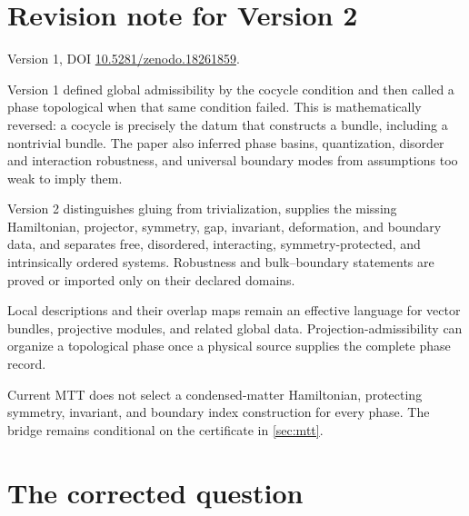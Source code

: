 \documentclass[11pt]{article}
\theoremstyle{definition}
\theoremstyle{remark}
\begin{document}
\section*{Revision note for Version 2}
\begin{description}[leftmargin=3.3cm,style=nextline]
\item[Supersedes.] Version 1, DOI
\href{https://doi.org/10.5281/zenodo.18261859}{10.5281/zenodo.18261859}.

\item[Reason.] Version 1 defined global admissibility by the cocycle
condition and then called a phase topological when that same condition
failed.  This is mathematically reversed: a cocycle is precisely the datum
that constructs a bundle, including a nontrivial bundle.  The paper also
inferred phase basins, quantization, disorder and interaction robustness,
and universal boundary modes from assumptions too weak to imply them.

\item[Resolution.] Version 2 distinguishes gluing from trivialization,
supplies the missing Hamiltonian, projector, symmetry, gap, invariant,
deformation, and boundary data, and separates free, disordered, interacting,
symmetry-protected, and intrinsically ordered systems.  Robustness and
bulk--boundary statements are proved or imported only on their declared
domains.

\item[Retained content.] Local descriptions and their overlap maps remain
an effective language for vector bundles, projective modules, and related
global data.  Projection-admissibility can organize a topological phase once
a physical source supplies the complete phase record.

\item[Remaining boundary.] Current MTT does not select a condensed-matter
Hamiltonian, protecting symmetry, invariant, and boundary index construction
for every phase.  The bridge remains conditional on the certificate in
\cref{sec:mtt}.
\end{description}

\tableofcontents

\section{The corrected question}
\end{document}
